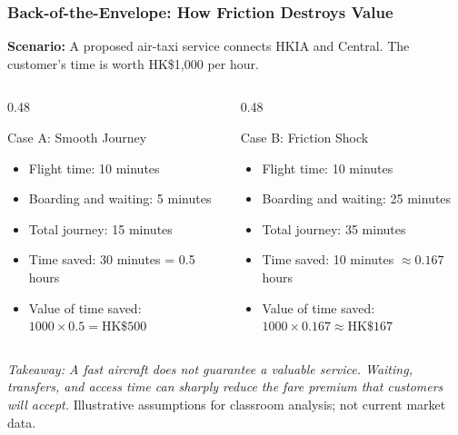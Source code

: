 \documentclass{beamer}
\begin{document}
\begin{frame}[t, shrink=15]
  \frametitle{Back-of-the-Envelope: How Friction Destroys Value}
  \textbf{Scenario:} A proposed air-taxi service connects HKIA and Central. The customer's time is worth HK\$1,000 per hour.
  \begin{columns}[T]
    \begin{column}{0.48\textwidth}
      \begin{block}{Case A: Smooth Journey}
      \begin{itemize}
        \item Flight time: 10 minutes
        \item Boarding and waiting: 5 minutes
        \item Total journey: 15 minutes
        \item Time saved: 30 minutes = 0.5 hours
        \item Value of time saved: \(1000\times0.5=\text{HK\$500}\)
      \end{itemize}
      \end{block}
    \end{column}
    \begin{column}{0.48\textwidth}
      \begin{block}{Case B: Friction Shock}
      \begin{itemize}
        \item Flight time: 10 minutes
        \item Boarding and waiting: 25 minutes
        \item Total journey: 35 minutes
        \item Time saved: 10 minutes \(\approx0.167\) hours
        \item Value of time saved: \(1000\times0.167\approx\text{HK\$167}\)
      \end{itemize}
      \end{block}
    \end{column}
  \end{columns}
  \vspace{0.25cm}
  \textit{Takeaway: A fast aircraft does not guarantee a valuable service. Waiting, transfers, and access time can sharply reduce the fare premium that customers will accept.}
  \vfill
  {\tiny Illustrative assumptions for classroom analysis; not current market data.}
\end{frame}
\end{document}
